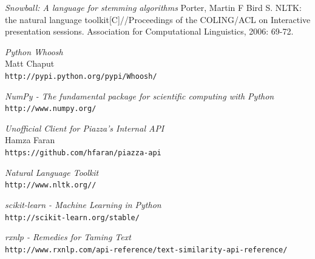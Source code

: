 \documentclass[sigconf]{acmart}
\begin{document}
\begin{thebibliography}{9}


\textit{Snowball: A language for stemming algorithms} 
Porter, Martin F
Bird S. NLTK: the natural language toolkit[C]//Proceedings of the COLING/ACL on Interactive presentation sessions. Association for Computational Linguistics, 2006: 69-72.

\textit{Python Whoosh} 
\\ Matt Chaput
\\\texttt{http://pypi.python.org/pypi/Whoosh/}
 
\textit{NumPy - The fundamental package for scientific computing with Python} 
\\\texttt{http://www.numpy.org/} 

\textit{Unofficial Client for Piazza's Internal API} 
\\ Hamza Faran
\\\texttt{https://github.com/hfaran/piazza-api} 
 
\textit{Natural Language Toolkit} 
\\\texttt{http://www.nltk.org//}

\textit{scikit-learn - Machine Learning in Python} 
\\\texttt{http://scikit-learn.org/stable/}


\textit{rxnlp - Remedies for Taming Text} 
\\\texttt{http://www.rxnlp.com/api-reference/text-similarity-api-reference/}


\end{thebibliography}
\end{document}

